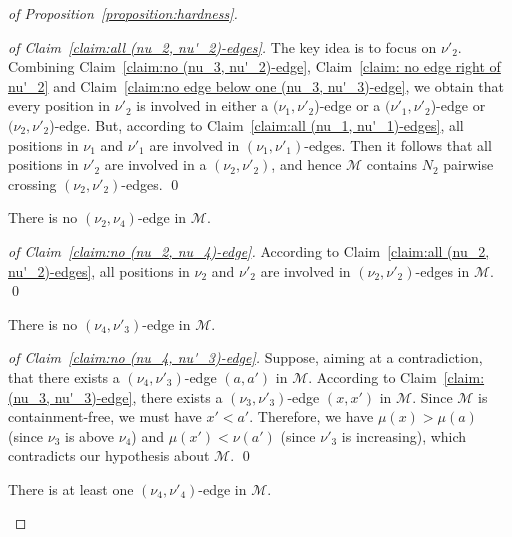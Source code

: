 \documentclass[a4paper]{llncs}
\begin{document}
\begin{proof}[of Proposition~\ref{proposition:hardness}]
  \begin{proof}[of Claim~\ref{claim:all (nu_2, nu'_2)-edges}]
    The key idea is to focus on $\nu'_2$.
    Combining Claim~\ref{claim:no (nu_3, nu'_2)-edge},
    Claim~\ref{claim: no edge right of nu'_2} and
    Claim~\ref{claim:no edge below one (nu_3, nu'_3)-edge},
    we obtain that every position in $\nu'_2$ is involved in
    either a $(\nu_1, \nu'_2$)-edge
    or a $(\nu'_1, \nu'_2$)-edge
    or $(\nu_2, \nu'_2$)-edge.
    But, according to Claim~\ref{claim:all (nu_1, nu'_1)-edges},
    all positions in $\nu_1$ and $\nu'_1$ are involved in
    $(\nu_1, \nu'_1)$-edges.
    Then it follows that
    all positions in $\nu'_2$ are involved in a $(\nu_2, \nu'_2)$,
    and hence
    $\mathcal{M}$ contains $N_2$ pairwise crossing $(\nu_2, \nu'_2)$-edges.
    \qed
  \end{proof}

  \begin{claim}
    \label{claim:no (nu_2, nu_4)-edge}
    There is no $(\nu_2, \nu_4)$-edge in $\mathcal{M}$.
  \end{claim}

  \begin{proof}[of Claim~\ref{claim:no (nu_2, nu_4)-edge}]
    According to Claim~\ref{claim:all (nu_2, nu'_2)-edges},
    all positions in $\nu_2$ and $\nu'_2$ are involved in
    $(\nu_2, \nu'_2)$-edges in $\mathcal{M}$.
    \qed
  \end{proof}

  \begin{claim}
    \label{claim:no (nu_4, nu'_3)-edge}
    There is no $(\nu_4, \nu'_3)$-edge in $\mathcal{M}$.
  \end{claim}

  \begin{proof}[of Claim~\ref{claim:no (nu_4, nu'_3)-edge}]
    Suppose, aiming at a contradiction, that there exists
    a $(\nu_4, \nu'_3)$-edge $(a, a')$ in $\mathcal{M}$.
    According to Claim~\ref{claim:(nu_3, nu'_3)-edge},
    there exists a $(\nu_3, \nu'_3)$-edge $(x, x')$
    in $\mathcal{M}$.
    Since $\mathcal{M}$ is containment-free, we must have
    $x' < a'$.
    Therefore,
    we have $\mu(x) > \mu(a)$ (since $\nu_3$ is above $\nu_4$) and
    $\mu(x') < \nu(a')$ (since $\nu'_3$ is increasing),
    which contradicts our hypothesis about $\mathcal{M}$.
    \qed
  \end{proof}

  \begin{claim}
    \label{claim:(nu_4, nu'_4)-edge}
    There is at least one $(\nu_4, \nu'_4)$-edge in $\mathcal{M}$.
  \end{claim}


\end{proof}
\end{document}

